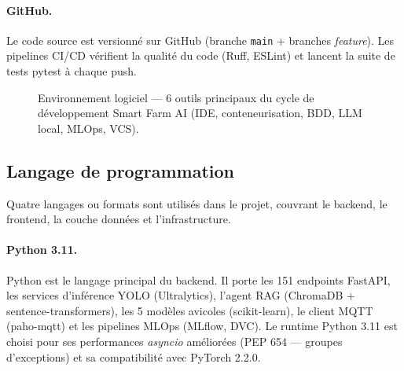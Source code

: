 \paragraph{GitHub.}
Le code source est versionné sur GitHub (branche \texttt{main} + branches
\textit{feature}). Les pipelines CI/CD vérifient la qualité du code
(Ruff, ESLint) et lancent la suite de tests pytest à chaque push.

\begin{figure}[H]
\centering
{}%
\caption{Environnement logiciel --- 6 outils principaux du cycle de développement
Smart Farm AI (IDE, conteneurisation, BDD, LLM local, MLOps, VCS).}
\label{fig:env_logiciel}
\end{figure}

\subsection{Langage de programmation}

Quatre langages ou formats sont utilisés dans le projet, couvrant le backend,
le frontend, la couche données et l'infrastructure.

\paragraph{Python 3.11.}
Python est le langage principal du backend. Il porte les 151 endpoints
FastAPI, les services d'inférence YOLO (Ultralytics), l'agent RAG
(ChromaDB + sentence-transformers), les 5 modèles avicoles (scikit-learn),
le client MQTT (paho-mqtt) et les pipelines MLOps (MLflow, DVC).
Le runtime Python 3.11 est choisi pour ses performances \textit{asyncio}
améliorées (PEP 654 — groupes d'exceptions) et sa compatibilité avec
PyTorch 2.2.0.

